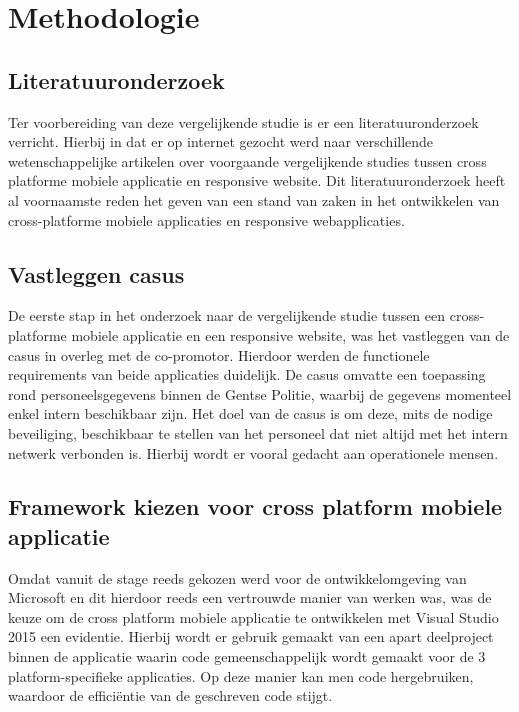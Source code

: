 
\chapter{Methodologie}
\label{ch:methodologie}


\section{Literatuuronderzoek}
Ter voorbereiding van deze vergelijkende studie is er een literatuuronderzoek verricht.
Hierbij in dat er op internet gezocht werd naar verschillende wetenschappelijke artikelen over voorgaande vergelijkende studies
tussen cross platforme mobiele applicatie en responsive website. Dit literatuuronderzoek heeft al voornaamste reden het geven van
een stand van zaken in het ontwikkelen van cross-platforme mobiele applicaties en responsive webapplicaties.

\section{Vastleggen casus}
De eerste stap in het onderzoek naar de vergelijkende studie tussen een cross-platforme mobiele applicatie en een
responsive website, was het vastleggen van de casus in overleg met de co-promotor. Hierdoor werden de functionele requirements van beide applicaties duidelijk.
De casus omvatte een toepassing rond personeelsgegevens binnen de Gentse Politie,
waarbij de gegevens momenteel enkel intern beschikbaar zijn. Het doel van de casus is om deze, mits de nodige beveiliging, beschikbaar
te stellen van het personeel dat niet altijd met het intern netwerk verbonden is. Hierbij wordt er vooral gedacht aan operationele mensen.

\section{Framework kiezen voor cross platform mobiele applicatie}
Omdat vanuit de stage reeds gekozen werd voor de ontwikkelomgeving van Microsoft en dit hierdoor reeds een vertrouwde
manier van werken was, was de keuze om de cross platform mobiele applicatie te ontwikkelen met Visual Studio 2015 een evidentie.
Hierbij wordt er gebruik gemaakt van een apart deelproject binnen de applicatie waarin code gemeenschappelijk wordt gemaakt voor
de 3 platform-specifieke applicaties. Op deze manier kan men code hergebruiken, waardoor de efficiëntie van de geschreven code stijgt.

